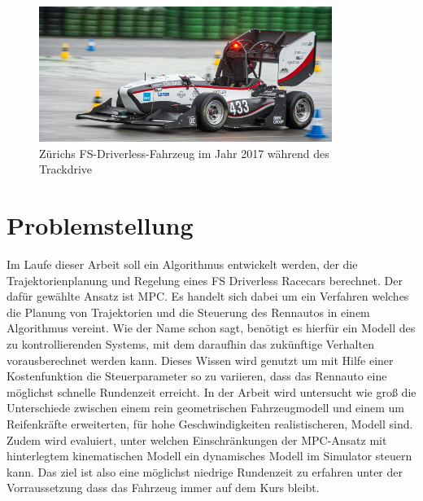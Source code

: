 \documentclass{like}
\begin{document}
\begin{figure}[hb!]
	\centering
	\includegraphics[width=270pt]{Abbildungen/amz-driverless-long.jpg}
	\caption{Zürichs \ac{FS}-Driverless-Fahrzeug im Jahr 2017 während des Trackdrive}
\end{figure}

\section{Problemstellung}
Im Laufe dieser Arbeit soll ein Algorithmus entwickelt werden, der die Trajektorienplanung und Regelung eines \ac{FS} Driverless Racecars berechnet. Der dafür gewählte Ansatz ist \acl{MPC}. Es handelt sich dabei um ein Verfahren welches die Planung von Trajektorien und die Steuerung des Rennautos in einem Algorithmus vereint. Wie der Name schon sagt, benötigt es hierfür ein Modell des zu kontrollierenden Systems, mit dem daraufhin das zukünftige Verhalten vorausberechnet werden kann. Dieses Wissen wird genutzt um mit Hilfe einer Kostenfunktion die Steuerparameter so zu variieren, dass das Rennauto eine möglichst schnelle Rundenzeit erreicht. In der Arbeit wird untersucht wie groß die Unterschiede zwischen einem rein geometrischen Fahrzeugmodell und einem um Reifenkräfte erweiterten, für hohe Geschwindigkeiten realistischeren, Modell sind. Zudem wird evaluiert, unter welchen Einschränkungen der \ac{MPC}-Ansatz mit hinterlegtem kinematischen Modell ein dynamisches Modell im Simulator steuern kann. Das ziel ist also eine möglichst niedrige Rundenzeit zu erfahren unter der Vorraussetzung dass das Fahrzeug immer auf dem Kurs bleibt.
\end{document}
